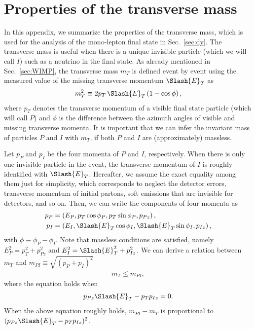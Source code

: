 \documentclass[12pt,twoside,book]{article}
\begin{document}
\section{Properties of the transverse mass}
\label{sec:mT}

\vskip 0.1in

In this appendix, we summarize the properties of the transverse mass, which is used for the analysis of the mono-lepton final state in Sec.~\ref{sec:dy}.
The transverse mass is useful when there is a unique invisible particle (which we will call $I$) such as a neutrino in the final state.
As already mentioned in Sec.~\ref{sec:WIMP}, the transverse mass $m_T$ is defined event by event using the measured value of the missing transverse momentum $\Slash{E}_{T}$ as
\begin{align}
  m_T^2 \equiv 2 p_T\,\Slash{E}_T \left( 1-\cos \phi \right),
\end{align}
where $p_T$ denotes the transverse momentum of a visible final state particle (which will call $P$) and $\phi$ is the difference between the azimuth angles of visible and missing transverse momenta.
It is important that we can infer the invariant mass of particles $P$ and $I$ with $m_T$, if both $P$ and $I$ are (approximately) massless.

Let $p_P$ and $p_I$ be the four momenta of $P$ and $I$, respectively.
When there is only one invisible particle in the event, the transverse momentum of $I$ is roughly identified with $\Slash{E}_T$.
Hereafter, we assume the exact equality among them just for simplicity, which corresponds to neglect the detector errors, transverse momentum of initial partons, soft emissions that are invisible for detectors, and so on.
Then, we can write the components of four momenta as
\begin{align}
  p_P &= \left( E_P, p_T \cos\phi_P, p_T \sin\phi_P, p_{Pz} \right),\\
  p_I &= \left( E_I, \Slash{E}_T \cos\phi_I, \Slash{E}_T \sin\phi_I, p_{Iz} \right),
\end{align}
with $\phi \equiv \phi_P - \phi_I$.
Note that massless conditions are satisfied, namely $E_P^2 = p_T^2 + p_{Pz}^2$ and $E_I^2 = \Slash{E}_T^2 + p_{Iz}^2$.
We can derive a relation between $m_T$ and $m_{PI} \equiv \sqrt{(p_P + p_I)^2}$
\begin{align}
  m_T \leq m_{PI},
\end{align}
where the equation holds when
\begin{align}
  p_{Pz} \Slash{E}_T - p_T p_{Iz} = 0.
\end{align}
When the above equation roughly holds, $m_{PI} - m_T$ is proportional to $(p_{Pz} \Slash{E}_T - p_T p_{Iz})^2$.
\end{document}

